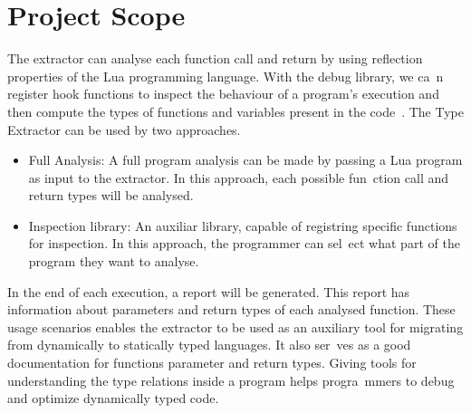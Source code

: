 
\chapter{Project Scope}
The extractor can analyse each function call and return by using reflection properties of the Lua programming language. With the debug library, we ca\
n register hook functions to inspect the behaviour of a program's execution and then compute the types of functions and variables present in the code\
.
\newline
The Type Extractor can be used by two approaches.
\begin{itemize}
    \item{Full Analysis:} A full program analysis can be made by passing a Lua program as input to the extractor. In this approach, each possible fun\
ction call and return types will be analysed.
    \item{Inspection library:} An auxiliar library, capable of registring specific functions for inspection. In this approach, the programmer can sel\
ect what part of the program they want to analyse.
\end{itemize}
In the end of each execution, a report will be generated. This report has information about parameters and return types of each analysed function.
\newline
These usage scenarios enables the extractor to be used as an auxiliary tool for migrating from dynamically to statically typed languages. It also ser\
ves as a good documentation for functions parameter and return types. Giving tools for understanding the type relations inside a program helps progra\
mmers to debug and optimize dynamically typed code.



